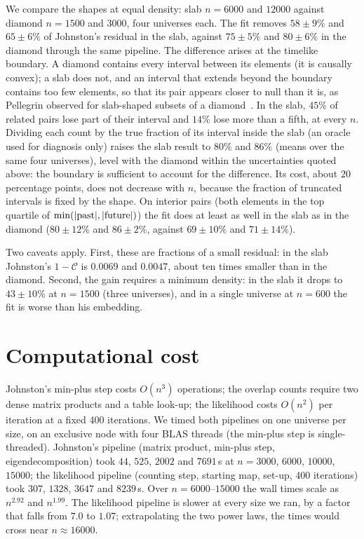 \documentclass[prd,twocolumn,superscriptaddress,nofootinbib,amsmath,amssymb,floatfix]{revtex4-2}
\begin{document}
We compare the shapes at equal density: slab $n=6000$ and $12000$ against diamond $n=1500$ and $3000$, four universes each. The fit removes $58\pm9\%$ and $65\pm6\%$ of Johnston's residual in the slab, against $75\pm5\%$ and $80\pm6\%$ in the diamond through the same pipeline. The difference arises at the timelike boundary. A diamond contains every interval between its elements (it is causally convex); a slab does not, and an interval that extends beyond the boundary contains too few elements, so that its pair appears closer to null than it is, as Pellegrin observed for slab-shaped subsets of a diamond~\cite{Pellegrin26}. In the slab, $45\%$ of related pairs lose part of their interval and $14\%$ lose more than a fifth, at every $n$. Dividing each count by the true fraction of its interval inside the slab (an oracle used for diagnosis only) raises the slab result to $80\%$ and $86\%$ (means over the same four universes), level with the diamond within the uncertainties quoted above: the boundary is sufficient to account for the difference. Its cost, about $20$ percentage points, does not decrease with $n$, because the fraction of truncated intervals is fixed by the shape. On interior pairs (both elements in the top quartile of $\min(|{\rm past}|,|{\rm future}|)$) the fit does at least as well in the slab as in the diamond ($80\pm12\%$ and $86\pm2\%$, against $69\pm10\%$ and $71\pm14\%$).

Two caveats apply. First, these are fractions of a small residual: in the slab Johnston's $1-\mathcal C$ is $0.0069$ and $0.0047$, about ten times smaller than in the diamond. Second, the gain requires a minimum density: in the slab it drops to $43\pm10\%$ at $n=1500$ (three universes), and in a single universe at $n=600$ the fit is worse than his embedding.

\section{Computational cost}\label{sec:cost}
Johnston's min-plus step costs $O(n^3)$ operations; the overlap counts require two dense matrix products and a table look-up; the likelihood costs $O(n^2)$ per iteration at a fixed 400 iterations. We timed both pipelines on one universe per size, on an exclusive node with four BLAS threads (the min-plus step is single-threaded). Johnston's pipeline (matrix product, min-plus step, eigendecomposition) took $44$, $525$, $2002$ and $7691$\,s at $n=3000$, $6000$, $10000$, $15000$; the likelihood pipeline (counting step, starting map, set-up, 400 iterations) took $307$, $1328$, $3647$ and $8239$\,s. Over $n=6000$--$15000$ the wall times scale as $n^{2.92}$ and $n^{1.99}$. The likelihood pipeline is slower at every size we ran, by a factor that falls from $7.0$ to $1.07$; extrapolating the two power laws, the times would cross near $n\approx16000$.
\end{document}
